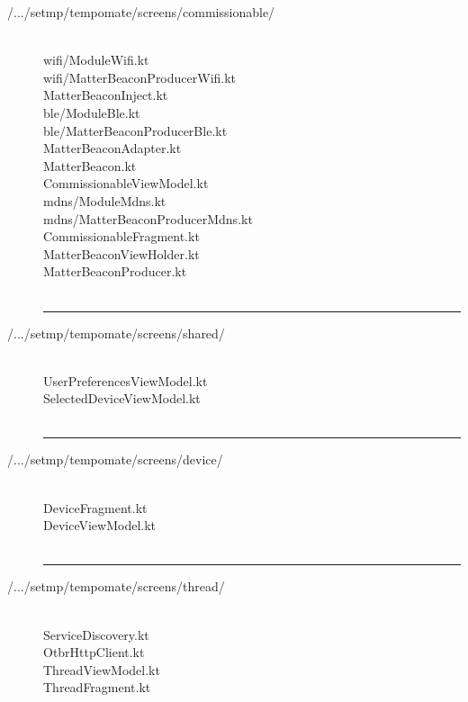 \begin{enumerate}[label=\alph*]
\begin{description}
    \item[/.../setmp/tempomate/screens/commissionable/] \hfill \\
    \footnotesize
        wifi/ModuleWifi.kt  \\
        wifi/MatterBeaconProducerWifi.kt  \\
        MatterBeaconInject.kt  \\
        ble/ModuleBle.kt  \\
        ble/MatterBeaconProducerBle.kt  \\
        MatterBeaconAdapter.kt  \\
        MatterBeacon.kt  \\
        CommissionableViewModel.kt  \\
        mdns/ModuleMdns.kt  \\
        mdns/MatterBeaconProducerMdns.kt  \\
        CommissionableFragment.kt  \\
        MatterBeaconViewHolder.kt  \\
        MatterBeaconProducer.kt  \\\\
        
            \vspace{-0.2cm}
      \hrule
      \vspace{0.2cm}
      
    \item[/.../setmp/tempomate/screens/shared/] \hfill \\
    \footnotesize
        UserPreferencesViewModel.kt  \\
        SelectedDeviceViewModel.kt  \\\\

            \vspace{-0.2cm}
      \hrule
      \vspace{0.2cm}
      
    \item[/.../setmp/tempomate/screens/device/] \hfill \\
    \footnotesize
        DeviceFragment.kt  \\
        DeviceViewModel.kt  \\\\

            \vspace{-0.2cm}
      \hrule
      \vspace{0.2cm}
      
    \item[/.../setmp/tempomate/screens/thread/] \hfill \\
    \footnotesize
        ServiceDiscovery.kt  \\
        OtbrHttpClient.kt  \\
        ThreadViewModel.kt  \\
        ThreadFragment.kt  \\\\


\end{description}
\end{enumerate}
